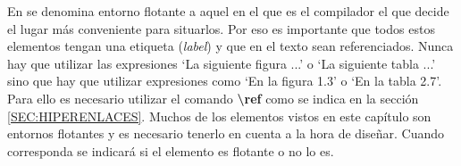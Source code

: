 En \LaTeXe se denomina entorno flotante a aquel en el que es el compilador el que decide el lugar más conveniente para situarlos. Por eso es importante que todos estos elementos tengan una etiqueta (\textsl{label}) y que en el texto sean referenciados. Nunca hay que utilizar las expresiones `La siguiente figura ...' o `La siguiente tabla ...' sino que hay que utilizar expresiones como `En la figura 1.3' o `En la tabla 2.7'. Para ello es necesario utilizar el comando \textbf{\textbackslash ref} como se indica en la sección \ref{SEC:HIPERENLACES}. Muchos de los elementos vistos en este capítulo son entornos flotantes y es necesario tenerlo en cuenta a la hora de diseñar. Cuando corresponda se indicará si el elemento es flotante o no lo es.
